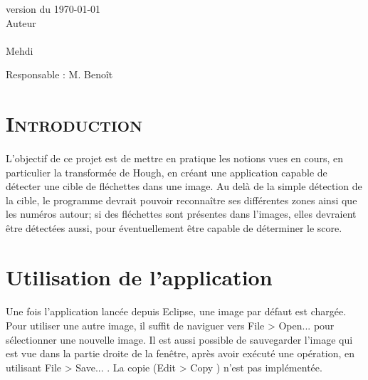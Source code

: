 \documentclass[a4paper, 11pt]{article}
\begin{document}
\begin{titlepage}
{\begin{center}
    \vspace{2mm}
    
    \large{version du \today}
    \vspace{25mm}\\
    Auteur\\~\\
    {
    \large
     Mehdi
    }
    
  \end{center}
  
  \vfill
  \begin{flushleft}
	Responsable  : M.  Benoît\\
  \end{flushleft}
}
\end{titlepage}

\clearpage


%
%

\section*{\color{unilim_red}\textsc{Introduction}}
\paragraph{}
L'objectif de ce projet est de mettre en pratique les notions vues en cours, en particulier la transformée de Hough, en créant une application capable de détecter une cible de fléchettes dans une image. Au delà de la simple détection de la cible, le programme devrait pouvoir reconnaître ses différentes zones ainsi que les numéros autour; si des fléchettes sont présentes dans l'images, elles devraient être détectées aussi, pour éventuellement être capable de déterminer le score.

\bigskip

\section{Utilisation de l'application}
\paragraph{}
Une fois l'application lancée depuis Eclipse, une image par défaut est chargée. Pour utiliser une autre image, il suffit de naviguer vers \og File > Open... \fg{} pour sélectionner une nouvelle image. Il est aussi possible de sauvegarder l'image qui est vue dans la partie droite de la fenêtre, après avoir exécuté une opération, en utilisant \og File > Save... \fg{}. La copie (\og Edit > Copy \fg{}) n'est pas implémentée.
\end{document}
